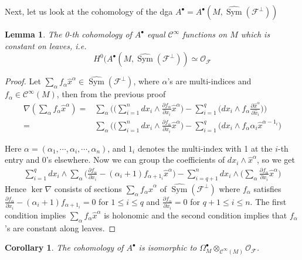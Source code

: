 \documentclass[12pt]{amsart}
\newtheorem{cor}[thm]{Corollary}
\newtheorem{lem}[thm]{Lemma}
\theoremstyle{definition}
\theoremstyle{remark}
\numberwithin{equation}{section}
\newcommand{\del}{\partial}
\renewcommand{\del}{\partial}
\newcommand{\CF}{{\mathcal F}}
\newcommand{\CO}{{\mathcal O}}
\newcommand{\cinf}{{\mathcal C}^{\infty}}
\newcommand{\A}{{A}}
\newcommand{\1}{{\mathbb{1}}}
\newcommand{\sym}{\operatorname{Sym}}
\begin{document}
   Next, let us look at the cohomology of the dga $\A^{\bullet}= \A^{\bullet}(M, \widehat{\sym}(\CF^{\perp}))$
   
   \begin{lem}The 0-th cohomology of $\A^{\bullet}$ equal $\cinf$ functions on $M$ which is constant on leaves, i.e. 
   	$$H^{0} (\A^{\bullet}(M, \widehat{\sym}(\CF^{\perp})) \simeq \CO_{\CF}$$
   \end{lem}

\begin{proof}
	Let $\sum_{\alpha}^{}f_{\alpha} \hat{x}^{\alpha} \in  \widehat{\sym}(\CF^{\perp})$, where $\alpha$'s are multi-indices and $f_{\alpha} \in \cinf(M)$, then from the previous proof
	\begin{align*}
	\nabla(\sum_{\alpha}^{}f_{\alpha}\hat{x}^{\alpha} ) 
	=&
	\sum_{\alpha}\bigg(\Big(\sum_{i=1}^{n}dx_i \wedge  \frac{\del f_{\alpha}}{ \del x_i} \hat{x}^{\alpha}\Big) - \sum_{i=1}^q \Big( dx_i \wedge f_{\alpha}\frac{\del \hat{x}^{\alpha}}{\del \hat{x}_i}\Big)\bigg)\\
	=&
	\sum_{\alpha}\bigg(\Big(\sum_{i=1}^{n}dx_i \wedge  \frac{\del f_{\alpha}}{ \del x_i} \hat{x}^{\alpha} \Big)- \sum_{i=1}^q \Big( dx_i \wedge f_{\alpha} \alpha_i \hat{x}^{\alpha -1_i}\bigg)
	\end{align*}

	
	Here $\alpha = (\alpha_1, \cdots, \alpha_i, \cdots, \alpha_n)$, and $1_i$ denotes the multi-index with 1 at the $i$-th entry and 0's elsewhere. Now we can group the coefficients of $dx_i \wedge \hat{x}^{\alpha}$, so we get
	\begin{align*}
	\sum_{i=1}^{q} dx_i \wedge   	\sum_{\alpha} \Big(\frac{\del f_{\alpha}}{ \del x_i} - (\alpha_i+1)f_{\alpha + 1_i} \hat{x}^{\alpha} \Big) - \sum_{i= q+1}^n dx_i \wedge \Big(\sum_{\alpha}^{} \frac{\del f_{\alpha}}{ \del x_i} \hat{x}^{\alpha}\Big)
	\end{align*}
	Hence $\ker\nabla$ consists of sections $\sum_{\alpha}^{}f_{\alpha} \hat{x}^{\alpha}$ of $\widehat{\sym}(\CF^{\perp})$ where $f_{\alpha}$ satisfies $\frac{\del f_{\alpha}}{ \del x_i} - (\alpha_i+1)f_{\alpha + 1_i} = 0$ for $1\le i \le q$ and $\frac{\del f_{\alpha}}{ \del x_i}=0$ for $q+1\le i \le n$. The first condition implies $\sum_{\alpha}^{}f_{\alpha} \hat{x}^{\alpha}$ is holonomic and the second condition implies that $f_{\alpha}$'s are constant along leaves.
	
	\end{proof}
\begin{cor}
	The cohomology of  $\A^{\bullet}$ is isomorphic to $\Omega^{\bullet}_M\otimes_{\cinf(M)} \CO_{\CF}$.
\end{cor}
\end{document}
